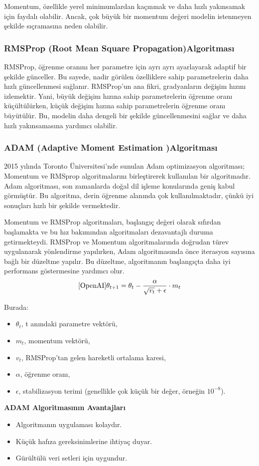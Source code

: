 \documentclass[12pt]{article}
\begin{document}
Momentum, özellikle yerel minimumlardan kaçınmak ve daha hızlı yakınsamak için faydalı olabilir. Ancak, çok büyük bir momentum değeri modelin istenmeyen şekilde sıçramasına neden olabilir.
\subsubsection{RMSProp (Root Mean Square Propagation)Algoritması}
RMSProp, öğrenme oranını her parametre için ayrı ayrı ayarlayarak adaptif bir şekilde günceller. Bu sayede, nadir görülen özelliklere sahip parametrelerin daha hızlı güncellenmesi sağlanır. RMSProp'un ana fikri, gradyanların değişim hızını izlemektir. Yani, büyük değişim hızına sahip parametrelerin öğrenme oranı küçültülürken, küçük değişim hızına sahip parametrelerin öğrenme oranı büyütülür. Bu, modelin daha dengeli bir şekilde güncellenmesini sağlar ve daha hızlı yakınsamasına yardımcı olabilir.
\subsubsection{ADAM (Adaptive Moment Estimation )Algoritması}
2015 yılında Toronto Üniversitesi'nde sunulan Adam optimizasyon algoritması; Momentum ve RMSprop algoritmalarını birleştirerek kullanılan bir algoritmadır. Adam algoritması, son zamanlarda doğal dil işleme konularında geniş kabul görmüştür. Bu algoritma, derin öğrenme alanında çok kullanılmaktadır, çünkü iyi sonuçları hızlı bir şekilde vermektedir.

Momentum ve RMSProp algoritmaları, başlangıç değeri olarak sıfırdan başlamakta ve bu hız bakımından algoritmaları dezavantajlı duruma getirmekteydi. RMSProp ve Momentum algoritmalarında doğrudan türev uygulanarak yönlendirme yapılırken, Adam algoritmasında önce iterasyon sayısına bağlı bir düzeltme yapılır. Bu düzeltme, algoritmanın başlangıçta daha iyi performans göstermesine yardımcı olur.
\begin{equation}\cite{OpenAI}
\theta_{t+1} = \theta_{t} - \frac{\alpha}{\sqrt{v_t} + \epsilon} \cdot m_t
\end{equation}

Burada:
\begin{itemize}
    \item $\theta_{t}$, t anındaki parametre vektörü,
    \item $m_t$, momentum vektörü,
    \item $v_t$, RMSProp'tan gelen hareketli ortalama karesi,
    \item $\alpha$, öğrenme oranı,
    \item $\epsilon$, stabilizasyon terimi (genellikle çok küçük bir değer, örneğin $10^{-8}$).
\end{itemize}
\textbf{ADAM Algoritmasının Avantajları}
\begin{itemize}
    \item Algoritmanın uygulaması kolaydır.
    \item Küçük hafıza gereksinimlerine ihtiyaç duyar.
    \item Gürültülü veri setleri için uygundur. 
\end{itemize}
\end{document}
